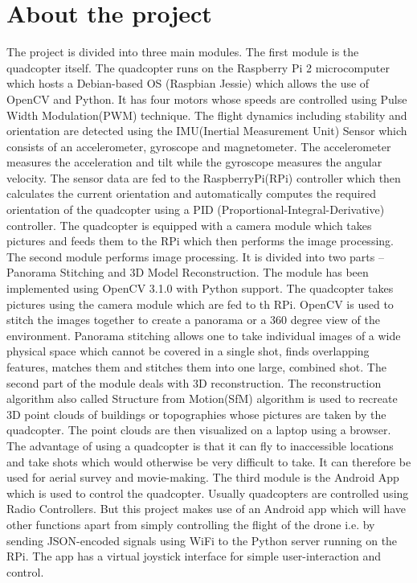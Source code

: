 \section{About the project} %
The project is divided into three main modules. The first module is the quadcopter itself. \linebreak
The quadcopter runs on the Raspberry Pi 2 microcomputer which hosts a Debian-based OS (Raspbian Jessie) which allows the use of OpenCV and Python. 
It has four motors whose speeds are controlled using Pulse Width Modulation(PWM) technique. The flight dynamics including stability and orientation are detected using the IMU(Inertial Measurement Unit) Sensor which consists of an accelerometer, gyroscope and magnetometer. The accelerometer measures the acceleration and tilt while the gyroscope measures the angular velocity. The sensor data are fed to the RaspberryPi(RPi) controller which then calculates the current orientation and automatically computes the required orientation of the quadcopter using a PID (Proportional-Integral-Derivative) controller. The quadcopter is equipped with a camera module which takes pictures and feeds them to the RPi which then performs the image processing.
\linebreak
The second module performs image processing. It is divided into two parts – Panorama Stitching and 3D Model Reconstruction. The module has been implemented using OpenCV 3.1.0 with Python support. The quadcopter takes pictures using the camera module which are fed to th RPi. OpenCV is used to stitch the images together to create a panorama or a 360 degree view of the environment. Panorama stitching allows one to take individual images of a wide physical space which cannot be covered in a single shot, finds overlapping features, matches them and stitches them into one large, combined shot. The second part of the module deals with 3D reconstruction. The reconstruction algorithm also called Structure from Motion(SfM) algorithm is used to recreate 3D point clouds of buildings or topographies whose pictures are taken by the quadcopter. The point clouds are then visualized on a laptop using a browser. The advantage of using a quadcopter is that it can fly to inaccessible locations and take shots which would otherwise be very difficult to take. It can therefore be used for aerial survey and movie-making.
\linebreak
The third module is the Android App which is used to control the quadcopter. Usually quadcopters are controlled using Radio Controllers. But this project makes use of an Android app which will have other functions apart from simply controlling the flight of the drone i.e. by sending JSON-encoded signals using WiFi to the Python server running on the RPi. The app has a virtual joystick interface for simple user-interaction and control. 